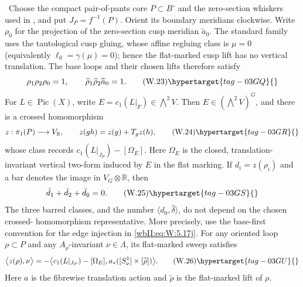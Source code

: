 \begin{lemma}
\hypertarget{tag-03IC}{}\label{wbII:lem:picard-crossed-defect}

\ Choose the compact pair-of-pants core $P\subset B^\circ$ and
the zero-section whiskers used in , and put
$J_P=f^{-1}(P)$.  Orient its boundary meridians clockwise.  Write
$\rho_0$ for the projection of the zero-section cusp meridian
$\widetilde a_0$.  The standard family uses the tautological cusp
gluing, whose affine regluing class is $\mu=0$ (equivalently
$\ell_0=\gamma(\mu)=0$); hence the flat-marked cusp lift has no vertical
translation.  The base loops and their chosen lifts therefore satisfy
\[
 \rho_1\rho_2\rho_0=1,
 \qquad
 \widehat\rho_1\widehat\rho_2\widetilde a_0=1.
\tag{W.23}\hypertarget{tag-03GQ}{}\label{wbII:eq:W:5.17g}
\]
For $L\in\operatorname{Pic}(X)$, write
$E=c_1(L|_F)\in\bigwedge^2V$.  Then $E\in(\bigwedge^2V)^G$, and there is a
crossed homomorphism
\[
 z:\pi_1(P)\longrightarrow V_{\mathbb R},\qquad
 z(gh)=z(g)+T_gz(h),
\tag{W.24}\hypertarget{tag-03GR}{}\label{wbII:eq:W:5.17h}
\]
whose class records
$c_1(L|_{J_P})-[\Omega_E]$.  Here $\Omega_E$ is the closed, translation-
invariant vertical two-form induced by $E$ in the flat marking.  If
$d_i=z(\rho_i)$ and a bar denotes the image in
$V_G\otimes\mathbb R$, then
\[
 \bar d_1+\bar d_2+\bar d_0=0.
\tag{W.25}\hypertarget{tag-03GS}{}\label{wbII:eq:W:5.17i}
\]
The three barred classes, and the number
$\langle d_0,\widehat\delta\rangle$, do not depend on the chosen crossed-
homomorphism representative.  More precisely, use the base-first convention
for the edge injection in \eqref{wbII:eq:W:5.17j}.  For any oriented loop $\rho\subset P$
and any $A_\rho$-invariant $\nu\in\Lambda$, its flat-marked sweep satisfies
\[
 \bigl\langle z(\rho),\nu\bigr\rangle
 =-\bigl\langle c_1(L|_{J_P})-[\Omega_E],
 a_*([S^1_\nu]\times[\widetilde\rho])\bigr\rangle.
\tag{W.26}\hypertarget{tag-03GU}{}\label{wbII:eq:W:5.17j'}
\]
Here $a$ is the fibrewise translation action and $\widetilde\rho$ is the
flat-marked lift of $\rho$.
\end{lemma}



